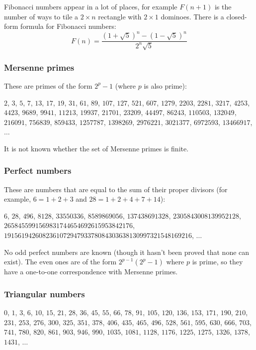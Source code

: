 \documentclass[a4paper,12pt]{article}
\begin{document}
Fibonacci numbers appear in a lot of places, for example $F(n+1)$ is the number of ways to tile a $2 \times n$ rectangle with $2 \times 1$ dominoes. There is a closed-form formula for Fibonacci numbers:
\[F(n)=\frac{\left(1+\sqrt{5}\right)^n-\left(1-\sqrt{5}\right)^n}{2^n\sqrt{5}}\]

\subsubsection{Mersenne primes}
These are primes of the form $2^p-1$ (where $p$ is also prime):

\begin{center}$2$, $3$, $5$, $7$, $13$, $17$, $19$, $31$, $61$, $89$, $107$, $127$, $521$, $607$, $1279$, $2203$, $2281$, $3217$, $4253$, $4423$, $9689$, $9941$, $11213$, $19937$, $21701$, $23209$, $44497$, $86243$, $110503$, $132049$, $216091$, $756839$, $859433$, $1257787$, $1398269$, $2976221$, $3021377$, $6972593$, $13466917$, $\ldots$\end{center}

It is not known whether the set of Mersenne primes is finite.

\subsubsection{Perfect numbers}
These are numbers that are equal to the sum of their proper divisors (for example, $6=1+2+3$ and $28=1+2+4+7+14$):

\begin{center}$6$, $28$, $496$, $8128$, $33550336$, $8589869056$, $137438691328$, $2305843008139952128$, $2658455991569831744654692615953842176$, $191561942608236107294793378084303638130997321548169216$, $\ldots$\end{center}

No odd perfect numbers are known (though it hasn't been proved that none can exist). The even ones are of the form $2^{p-1}(2^p-1)$ where $p$ is prime, so they have a one-to-one correspondence with Mersenne primes.

\subsubsection{Triangular numbers}

\begin{center}$0$, $1$, $3$, $6$, $10$, $15$, $21$, $28$, $36$, $45$, $55$, $66$, $78$, $91$, $105$, $120$, $136$, $153$, $171$, $190$, $210$, $231$, $253$, $276$, $300$, $325$, $351$, $378$, $406$, $435$, $465$, $496$, $528$, $561$, $595$, $630$, $666$, $703$, $741$, $780$, $820$, $861$, $903$, $946$, $990$, $1035$, $1081$, $1128$, $1176$, $1225$, $1275$, $1326$, $1378$, $1431$, $\ldots$\end{center}
\end{document}
